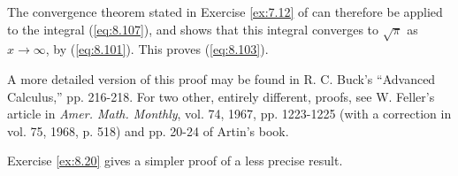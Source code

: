 The convergence theorem stated in Exercise \ref{ex:7.12} of can therefore be applied to the integral (\ref{eq:8.107}),
and shows that this integral converges to $\sqrt{\pi}$ as $x \rightarrow \infty$, by (\ref{eq:8.101}).
This proves (\ref{eq:8.103}).

A more detailed version of this proof may be found in R. C. Buck's\cite{BUCK1962} ``Advanced Calculus,''\cite{BUCK1965AdvancedCalculus} pp. 216-218.
For two other, entirely different, proofs,
see W. Feller's article in \emph{Amer. Math. Monthly}, vol. 74, 1967, pp. 1223-1225
(with a correction in vol. 75, 1968, p. 518) and pp. 20-24 of Artin's book\cite{ARTIN1964}.

Exercise \ref{ex:8.20} gives a simpler proof of a less precise result.